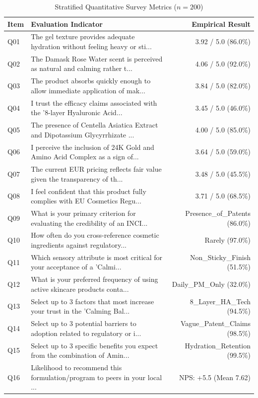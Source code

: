 \documentclass[10pt,twocolumn,a4paper]{article}
\begin{document}
\begin{table}[t]
\centering
\caption{Stratified Quantitative Survey Metrics ($n = 200$)}
\label{tab:metrics}
\small
\begin{tabularx}{\textwidth}{l X r}
\toprule
\textbf{Item} & \textbf{Evaluation Indicator} & \textbf{Empirical Result} \\
\midrule
Q01 & The gel texture provides adequate hydration without feeling heavy or sti... & 3.92 / 5.0 (86.0\%) \\
Q02 & The Damask Rose Water scent is perceived as natural and calming rather t... & 4.06 / 5.0 (92.0\%) \\
Q03 & The product absorbs quickly enough to allow immediate application of mak... & 3.84 / 5.0 (82.0\%) \\
Q04 & I trust the efficacy claims associated with the '8-layer Hyaluronic Acid... & 3.45 / 5.0 (46.0\%) \\
Q05 & The presence of Centella Asiatica Extract and Dipotassium Glycyrrhizate ... & 4.00 / 5.0 (85.0\%) \\
Q06 & I perceive the inclusion of 24K Gold and Amino Acid Complex as a sign of... & 3.64 / 5.0 (59.0\%) \\
Q07 & The current EUR pricing reflects fair value given the transparency of th... & 3.48 / 5.0 (45.5\%) \\
Q08 & I feel confident that this product fully complies with EU Cosmetics Regu... & 3.71 / 5.0 (68.5\%) \\
Q09 & What is your primary criterion for evaluating the credibility of an INCI... & Presence\_of\_Patents (86.0\%) \\
Q10 & How often do you cross-reference cosmetic ingredients against regulatory... & Rarely (97.0\%) \\
Q11 & Which sensory attribute is most critical for your acceptance of a 'Calmi... & Non\_Sticky\_Finish (51.5\%) \\
Q12 & What is your preferred frequency of using active skincare products conta... & Daily\_PM\_Only (32.0\%) \\
Q13 & Select up to 3 factors that most increase your trust in the 'Calming Bal... & 8\_Layer\_HA\_Tech (94.5\%) \\
Q14 & Select up to 3 potential barriers to adoption related to regulatory or i... & Vague\_Patent\_Claims (98.5\%) \\
Q15 & Select up to 3 specific benefits you expect from the combination of Amin... & Hydration\_Retention (99.5\%) \\
Q16 & Likelihood to recommend this formulation/program to peers in your local ... & NPS: +5.5 (Mean 7.62) \\
\bottomrule
\end{tabularx}
\end{table}
\end{document}
